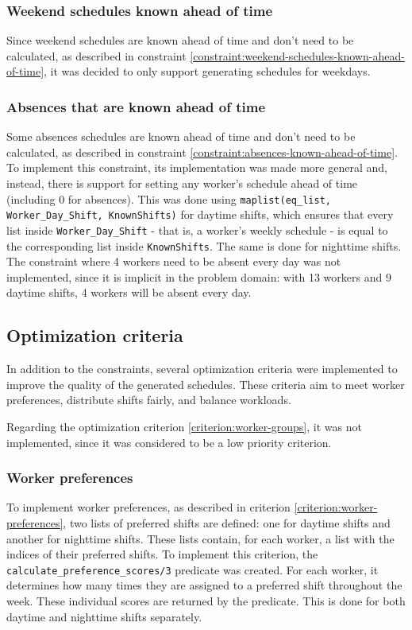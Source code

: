 \documentclass[conference]{IEEEtran}
\def\constraint#1{\vspace{4pt} {#1}}
\begin{document}
\constraint {
    \subsubsection*{Weekend schedules known ahead of time}   
    Since weekend schedules are known ahead of time and don't need to be calculated, as described in constraint \ref{constraint:weekend-schedules-known-ahead-of-time}, it was decided to only support generating schedules for weekdays.
}
    
\constraint {
    \subsubsection*{Absences that are known ahead of time}
    Some absences schedules are known ahead of time and don't need to be calculated, as described in constraint \ref{constraint:absences-known-ahead-of-time}. To implement this constraint, its implementation was made more general and, instead, there is support for setting any worker's schedule ahead of time (including 0 for absences).
    This was done using \texttt{maplist(eq\_list, Worker\_Day\_Shift, KnownShifts)} for daytime shifts, which ensures that every list inside \texttt{Worker\_Day\_Shift} - that is, a worker's weekly schedule - is equal to the corresponding list inside \texttt{KnownShifts}. The same is done for nighttime shifts.
    The constraint where 4 workers need to be absent every day was not implemented, since it is implicit in the problem domain: with 13 workers and 9 daytime shifts, 4 workers will be absent every day.
}

\subsection{Optimization criteria}
\label{section:optimization-criteria}

In addition to the constraints, several optimization criteria were implemented to improve the quality of the generated schedules. These criteria aim to meet worker preferences, distribute shifts fairly, and balance workloads.

Regarding the optimization criterion \ref{criterion:worker-groups}, it was not implemented, since it was considered to be a low priority criterion.

\constraint {
    \subsubsection*{Worker preferences}
    To implement worker preferences, as described in criterion \ref{criterion:worker-preferences}, two lists of preferred shifts are defined: one for daytime shifts and another for nighttime shifts. These lists contain, for each worker, a list with the indices of their preferred shifts.
    To implement this criterion, the \texttt{calculate\_preference\_scores/3} predicate was created. For each worker, it determines how many times they are assigned to a preferred shift throughout the week. These individual scores are returned by the predicate. This is done for both daytime and nighttime shifts separately.
}
\end{document}
